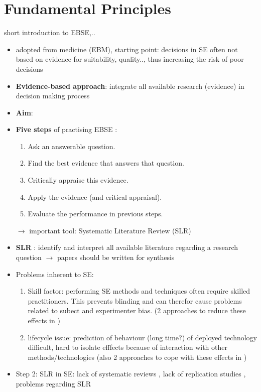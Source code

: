 \section{Fundamental Principles}

short introduction to EBSE,..

\begin{itemize}
	\item adopted from medicine (EBM), starting point: decisions in SE often not based on evidence for suitability, quality.., thus increasing the risk of poor decisions 
	\item \textbf{Evidence-based approach}: integrate all available research (evidence) in decision making process
	\item \textbf{Aim}:  \cite{EBSEpract}
	\item \textbf{Five steps} of practising EBSE \cite{EBSE}:
		\begin{enumerate}
			\item Ask an answerable question.
			\item Find the best evidence that answers that question.
			\item Critically appraise this evidence.
			\item Apply the evidence (and critical appraisal).
			\item Evaluate the performance in previous steps.
		\end{enumerate}
		$\rightarrow$ important tool: Systematic Literature Review (SLR)
	\item \textbf{SLR} \cite{keele2007}: identify and interpret all available literature regarding a research question
		$\rightarrow$ papers should be written for synthesis 
	\item Problems inherent to SE\cite{EBSE}:
		\begin{enumerate}
			\item Skill factor: performing SE methods and techniques often require skilled practitioners. This prevents blinding and can therefor cause problems related to subect and experimenter bias. (2 approaches to reduce these effects in \cite{EBSE})
			\item lifecycle issue: prediction of behaviour (long time?) of deployed technology difficult, hard to isolate efffects because of interaction with other methods/technologies (also 2 approaches to cope with these effects in \cite{EBSE})
		\end{enumerate}
		\item Step 2: SLR in SE: lack of systematic reviews , lack of replication studies , problems regarding SLR 
\end{itemize}